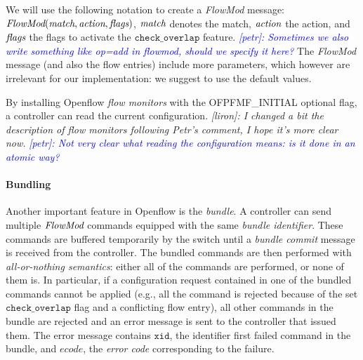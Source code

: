 \documentclass[conference]{sigcomm-alternate}
\newcommand{\FlowMod}{\emph{FlowMod}\xspace}
\newcommand{\match}{\emph{match}\xspace}
\newcommand{\action}{\emph{action}\xspace}
\newcommand{\flags}{\emph{flags}\xspace}
\newcommand{\checko}{\texttt{check\_overlap}\xspace}
\newcommand{\liron}[1]{\textit{\textcolor{mygreen}{[liron]: #1}}} %
\newcommand{\petr}[1]{\textit{\textcolor{blue}{[petr]: #1}}} %
\newcommand{\xid}{\texttt{xid}}
\begin{document}
We will use the following notation to create a \emph{FlowMod} message:
$\FlowMod(\match, \action, \flags)$, $\match$ denotes the match,
$\action$ the action, and $\flags$ the flags to activate the $\checko$
feature.
\petr{Sometimes we also write something like op=add in flowmod, should
  we specify it here?}  
The \emph{FlowMod} message (and also the flow entries) include more parameters,
which however are irrelevant for our implementation: we suggest to
use the default values.


By installing Openflow \emph{flow monitors} with the \textsf{OFPFMF\_INITIAL} optional flag,  
a controller can read the current configuration. 
%
\liron{I changed a bit the description of flow monitors following Petr's comment, I hope it's more clear now.}
\petr{Not very clear what reading the configuration means: is it done
  in an atomic way?}




\paragraph{Bundling}

Another important feature in Openflow is the \emph{bundle}. 
A controller can send multiple $\FlowMod$ commands  equipped with 
the same \emph{bundle identifier}.
These commands are buffered temporarily by
the switch until a \emph{bundle commit} message is received from the
controller. 
The bundled commands are then performed with \emph{all-or-nothing semantics}:
either all of the commands are performed, or none of them is. 
In particular, if a configuration request contained in one of the bundled commands cannot
be applied (e.g.,  all the command is rejected because of the set
$\checko$ flag and a conflicting flow entry), all  other commands in
the bundle are rejected and an error
message is sent to the controller that issued them.
The error message contains $\xid$, the identifier  first failed command in the
bundle, and $ecode$, the \emph{error code} corresponding to the failure.   
\end{document}
